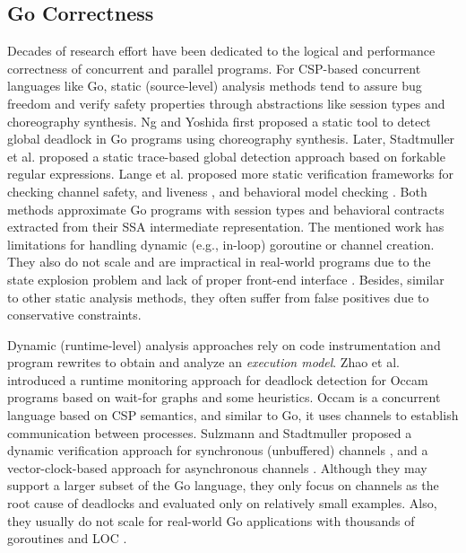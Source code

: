 \subsection{Go Correctness}
Decades of research effort have been dedicated to the logical and performance correctness of concurrent and parallel programs.
%
For CSP-based concurrent languages like Go, static (source-level) analysis methods \cite{ng-dl-cc16,lange-fence-popl17,lange-staticType-icse18} tend to assure bug freedom and verify safety properties through abstractions like session types and choreography synthesis.
%
Ng and Yoshida \cite{ng-dl-cc16} first proposed a static tool to detect global deadlock in Go programs using choreography synthesis.
%
Later, Stadtmuller et al. \cite{stadtmuller-minigo-aplas16} proposed a static trace-based global detection approach based on forkable regular expressions.
%
Lange et al. proposed more static verification frameworks for checking channel safety, and liveness \cite{lange-fence-popl17}, and behavioral model checking \cite{lange-staticType-icse18}.
%
Both methods approximate Go programs with session types and behavioral contracts extracted from their SSA intermediate representation.
%
The mentioned work has limitations for handling dynamic (e.g., in-loop) goroutine or channel creation.
%
They also do not scale and are impractical in real-world programs due to the state explosion problem and lack of proper front-end interface \cite{yuan-gobench-cgo21}.
%
Besides, similar to other static analysis methods, they often suffer from false positives due to conservative constraints.

%
Dynamic (runtime-level) analysis approaches \cite{sulzmann-twophase-2018,dilley-gomela-corr2020} rely on code instrumentation and program rewrites to obtain and analyze an \textit{execution model}.
%
Zhao et al. \cite{zhao-occam97} introduced a runtime monitoring approach for deadlock detection for Occam programs based on wait-for graphs and some heuristics. Occam is a concurrent language based on CSP semantics, and similar to Go, it uses channels to establish communication between processes.
%
Sulzmann and Stadtmuller proposed a dynamic verification approach for synchronous (unbuffered) channels \cite{sulzmann-corr17}, and a vector-clock-based approach for asynchronous channels \cite{sulzmann-twophase-2018}.
%
Although they may support a larger subset of the Go language, they only focus on channels as the root cause of deadlocks and evaluated only on relatively small examples.
%
Also, they usually do not scale for real-world Go applications with thousands of goroutines and LOC \cite{dilley-empirical-saner19}.
%

